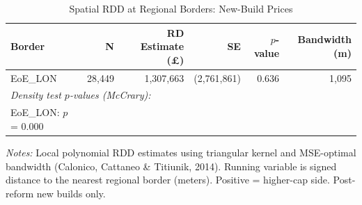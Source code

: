 \begin{table}[htbp]
\centering
\caption{Spatial RDD at Regional Borders: New-Build Prices}
\label{tab:rdd}
\begin{tabular}{lrrrrr}
\hline\hline
Border & N & RD Estimate (\pounds) & SE & $p$-value & Bandwidth (m) \\
\hline
EoE_LON & 28,449 & 1,307,663 & (2,761,861) & 0.636 & 1,095 \\
\hline
\multicolumn{6}{l}{\textit{Density test $p$-values (McCrary):}} \\
EoE_LON: $p$ = 0.000 \\
\hline\hline
\end{tabular}
\begin{minipage}{0.85\textwidth}
\footnotesize \textit{Notes:} Local polynomial RDD estimates using triangular kernel and MSE-optimal bandwidth (Calonico, Cattaneo \& Titiunik, 2014). Running variable is signed distance to the nearest regional border (meters). Positive = higher-cap side. Post-reform new builds only.
\end{minipage}
\end{table}
